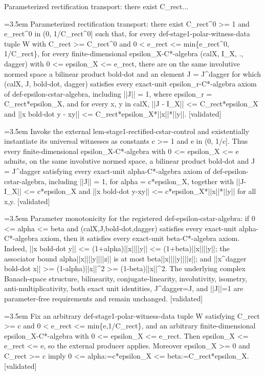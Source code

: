 \documentclass{article}
\newcommand{\step}[1]{\par\noindent\hangindent=3.5em\hangafter=1%
  \makebox[3.5em][l]{\textbf{#1.}}}
\newcommand{\steptag}[1]{\hfill{\small\textsf{[#1]}}}
\begin{document}
\begin{proofbox}{Parameterized rectification transport: there exist C\_rect...}
\step{1} Parameterized rectification transport: there exist C\_rect\textasciicircum{}0 >= 1 and e\_rect\textasciicircum{}0 in (0, 1/C\_rect\textasciicircum{}0] such that, for every def-stage1-polar-witness-data tuple W with C\_rect >= C\_rect\textasciicircum{}0 and 0 < e\_rect <= min\{e\_rect\textasciicircum{}0, 1/C\_rect\}, for every finite-dimensional epsilon\_X-C*-algebra (calX, I\_X, ., dagger) with 0 <= epsilon\_X <= e\_rect, there are on the same involutive normed space a bilinear product bold-dot and an element J = J\textasciicircum{}dagger for which (calX, J, bold-dot, dagger) satisfies every exact-unit epsilon\_r-C*-algebra axiom of def-epsilon-cstar-algebra, including ||J|| = 1, where epsilon\_r = C\_rect*epsilon\_X, and for every x, y in calX, ||J - I\_X|| <= C\_rect*epsilon\_X and ||x bold-dot y - xy|| <= C\_rect*epsilon\_X*||x||*||y||. \steptag{validated} \\[6pt]
\step{1.1} Invoke the external lem-stage1-rectified-cstar-control and existentially instantiate its universal witnesses as constants c >= 1 and e in (0, 1/c]. Thus every finite-dimensional epsilon\_X-C*-algebra with 0 <= epsilon\_X <= e admits, on the same involutive normed space, a bilinear product bold-dot and J = J\textasciicircum{}dagger satisfying every exact-unit alpha-C*-algebra axiom of def-epsilon-cstar-algebra, including ||J|| = 1, for alpha = c*epsilon\_X, together with ||J-I\_X|| <= c*epsilon\_X and ||x bold-dot y-xy|| <= c*epsilon\_X*||x||*||y|| for all x,y. \steptag{validated} \\[4pt]
\step{1.2} Parameter monotonicity for the registered def-epsilon-cstar-algebra: if 0 <= alpha <= beta and (calX,J,bold-dot,dagger) satisfies every exact-unit alpha-C*-algebra axiom, then it satisfies every exact-unit beta-C*-algebra axiom. Indeed, ||x bold-dot y|| <= (1+alpha)||x||||y|| <= (1+beta)||x||||y||; the associator bound alpha||x||||y||||z|| is at most beta||x||||y||||z||; and ||x\textasciicircum{}dagger bold-dot x|| >= (1-alpha)||x||\textasciicircum{}2 >= (1-beta)||x||\textasciicircum{}2. The underlying complex Banach-space structure, bilinearity, conjugate-linearity, involutivity, isometry, anti-multiplicativity, both exact unit identities, J\textasciicircum{}dagger=J, and ||J||=1 are parameter-free requirements and remain unchanged. \steptag{validated} \\[4pt]
\step{1.3} Fix an arbitrary def-stage1-polar-witness-data tuple W satisfying C\_rect >= c and 0 < e\_rect <= min\{e,1/C\_rect\}, and an arbitrary finite-dimensional epsilon\_X-C*-algebra with 0 <= epsilon\_X <= e\_rect. Then epsilon\_X <= e\_rect <= e, so the external producer applies. Moreover epsilon\_X >= 0 and C\_rect >= c imply 0 <= alpha:=c*epsilon\_X <= beta:=C\_rect*epsilon\_X. \steptag{validated} \\[4pt]

\end{proofbox}
\end{document}
